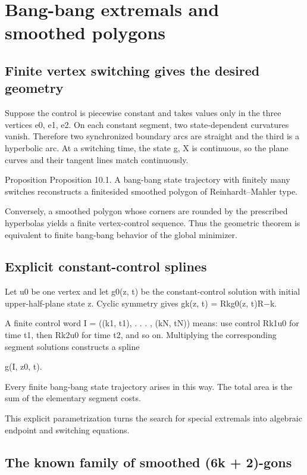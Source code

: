 \chapter{Bang-bang extremals and smoothed polygons}
\section{Finite vertex switching gives the desired geometry}

Suppose the control is piecewise constant and takes values only in the three vertices e0, e1, e2. On each constant segment, two state-dependent curvatures vanish. Therefore two synchronized boundary arcs are straight and the third is a hyperbolic arc. At a switching time, the state g, X is continuous, so the plane curves and their tangent lines match continuously.


\begin{statementbox}{Proposition}
Proposition 10.1. A bang-bang state trajectory with finitely many switches reconstructs a finitesided smoothed polygon of Reinhardt–Mahler type.
\end{statementbox}

Conversely, a smoothed polygon whose corners are rounded by the prescribed hyperbolas yields a finite vertex-control sequence. Thus the geometric theorem is equivalent to finite bang-bang behavior of the global minimizer.


\section{Explicit constant-control splines}

Let u0 be one vertex and let g0(z, t) be the constant-control solution with initial upper-half-plane state z. Cyclic symmetry gives gk(z, t) = Rkg0(z, t)R−k.


A finite control word I = ((k1, t1), . . . , (kN, tN)) means: use control Rk1u0 for time t1, then Rk2u0 for time t2, and so on. Multiplying the corresponding segment solutions constructs a spline


g(I, z0, t).


Every finite bang-bang state trajectory arises in this way. The total area is the sum of the elementary segment costs.


This explicit parametrization turns the search for special extremals into algebraic endpoint and switching equations.


\section{The known family of smoothed (6k + 2)-gons}

